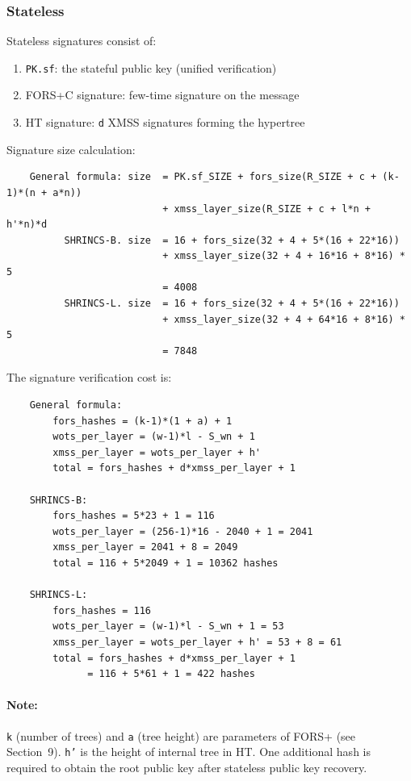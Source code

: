 \subsubsection{Stateless}
Stateless signatures consist of:
\begin{enumerate}
    \item \texttt{PK.sf}: the stateful public key (unified verification)
    \item FORS+C signature: few-time signature on the message
    \item HT signature: \texttt{d} XMSS signatures forming the hypertree
\end{enumerate}

Signature size calculation: 
\begin{verbatim}
    General formula: size  = PK.sf_SIZE + fors_size(R_SIZE + c + (k-1)*(n + a*n)) 
                           + xmss_layer_size(R_SIZE + c + l*n + h'*n)*d
          SHRINCS-B. size  = 16 + fors_size(32 + 4 + 5*(16 + 22*16)) 
                           + xmss_layer_size(32 + 4 + 16*16 + 8*16) * 5
                           = 4008
          SHRINCS-L. size  = 16 + fors_size(32 + 4 + 5*(16 + 22*16)) 
                           + xmss_layer_size(32 + 4 + 64*16 + 8*16) * 5
                           = 7848
\end{verbatim}

The signature verification cost is:
\begin{verbatim}
    General formula:
        fors_hashes = (k-1)*(1 + a) + 1
        wots_per_layer = (w-1)*l - S_wn + 1
        xmss_per_layer = wots_per_layer + h'
        total = fors_hashes + d*xmss_per_layer + 1

    SHRINCS-B:
        fors_hashes = 5*23 + 1 = 116
        wots_per_layer = (256-1)*16 - 2040 + 1 = 2041
        xmss_per_layer = 2041 + 8 = 2049
        total = 116 + 5*2049 + 1 = 10362 hashes

    SHRINCS-L:
        fors_hashes = 116
        wots_per_layer = (w-1)*l - S_wn + 1 = 53
        xmss_per_layer = wots_per_layer + h' = 53 + 8 = 61
        total = fors_hashes + d*xmss_per_layer + 1
              = 116 + 5*61 + 1 = 422 hashes
\end{verbatim}

\paragraph{Note:} \texttt{k} (number of trees) and \texttt{a} (tree height) are parameters of FORS+ (see Section~9). \texttt{h'} is the height of internal tree in HT. One additional hash is required to obtain the root public key after stateless public key recovery. 

